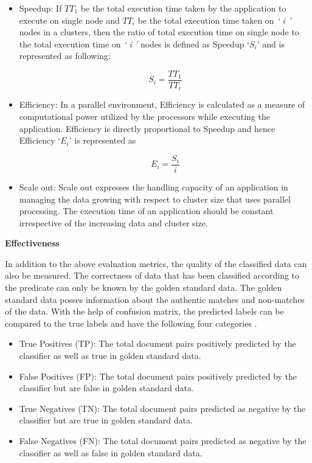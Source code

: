 \begin{itemize}
\item Speedup: If \(TT_1\) be the total execution time taken by the application to execute on single node and  \(TT_i\) be the total execution time taken on \textit{` i '} nodes in a clusters, then  the ratio of total execution time on single node to the total execution time on \textit{` i '} nodes is defined as Speedup `\(S_i \)' and is represented as following:

\begin{equation}\label{formula: speedup}
S_i = \frac{TT_1}{TT_i}
\end{equation}

\item Efficiency: In a parallel environment, Efficiency is calculated as a measure of computational power utilized by the processors while executing the application. Efficiency is directly proportional to Speedup and hence Efficiency `\(E_i\)' is represented as

\begin{equation}\label{formula: efficiency}
E_i = \frac{S_i}{i}
\end{equation}

 
\item Scale out: Scale out expresses the handling capacity of an application in managing the data growing with respect to cluster size that uses parallel processing. The execution time of an application should be constant irrespective of the increasing data and cluster size. 
\end{itemize}
 
\textbf{Effectiveness} 
\par In addition to the above evaluation metrics, the quality of the classified data can also be measured.  The correctness of data that has been classified according to the predicate can only be known by the golden standard data. The golden standard data posses information about the authentic matches and non-matches of the data. With the help of confusion matrix, the predicted labels can be compared to the true labels and have the following four categories \cite{tripathy2015classification}.

\begin{itemize}
\item True Positives (TP): The total document pairs positively predicted by the classifier as well as true in golden standard data.

\item False Positives (FP): The total document pairs positively predicted by the classifier but are false in golden standard data.

\item True Negatives (TN): The total document pairs predicted as negative by the classifier but are true in golden standard data.

\item False Negatives (FN): The total document pairs predicted as negative by the classifier as well as false in golden standard data.
\end{itemize}

